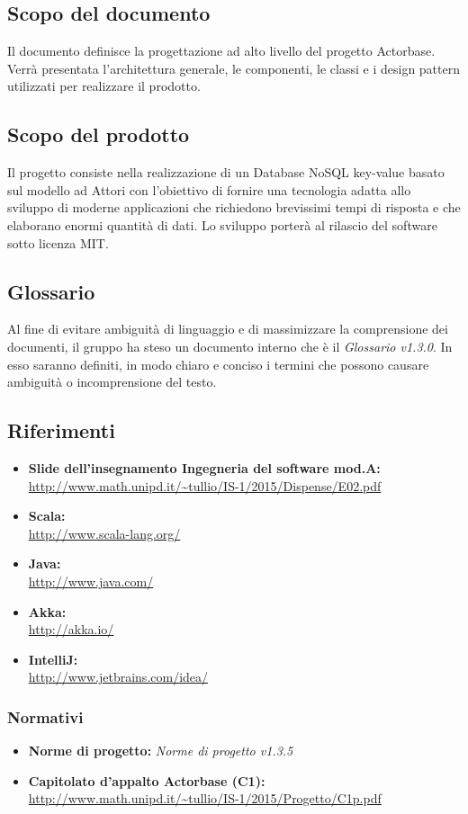 \documentclass[a4paper]{article}
\begin{document}
	\subsection{Scopo del documento}
		Il documento definisce la progettazione ad alto livello del progetto Actorbase.
		Verrà presentata l'architettura generale, le componenti, le classi e i design pattern utilizzati per realizzare il prodotto.
	\subsection{Scopo del prodotto}
		Il progetto consiste nella realizzazione di un Database NoSQL key-value basato sul modello ad 
		Attori con l'obiettivo di fornire una tecnologia adatta allo sviluppo di moderne 
		applicazioni che richiedono brevissimi tempi di risposta e che elaborano enormi quantità 
		di dati. Lo sviluppo porterà al rilascio del software sotto licenza MIT.
	\subsection{Glossario}
		Al fine di evitare ambiguità di linguaggio e di massimizzare la comprensione dei documenti, il 
      gruppo ha steso un documento interno che è il \emph{Glossario v1.3.0}. In esso saranno definiti, in modo
      chiaro e conciso i termini che possono causare ambiguità o incomprensione del testo.
	\subsection{Riferimenti}
		\begin{itemize}
			\item \textbf{Slide dell'insegnamento Ingegneria del software mod.A:} \\
			\url{http://www.math.unipd.it/~tullio/IS-1/2015/Dispense/E02.pdf}
			\item \textbf{Scala:} \\
			\url{http://www.scala-lang.org/}
			\item \textbf{Java:} \\
			\url{http://www.java.com/}
			\item \textbf{Akka:} \\
			\url{http://akka.io/}
			\item \textbf{IntelliJ:} \\
			\url{http://www.jetbrains.com/idea/}
		\end{itemize}
	\subsubsection{Normativi}
		\begin{itemize}
			\item \textbf{Norme di progetto:} \emph{Norme di progetto v1.3.5}
			\item \textbf{Capitolato d'appalto Actorbase (C1):} \\ 
			\url{http://www.math.unipd.it/~tullio/IS-1/2015/Progetto/C1p.pdf}
		\end{itemize}
		
\end{document}
